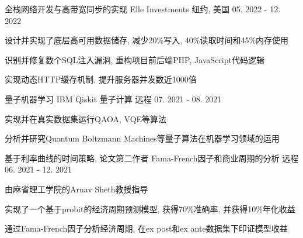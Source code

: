 \begin{cventries}
  \cventry
    {全栈网络开发与高带宽同步的实现}
    {Elle Investments}
    {纽约, 美国}
    {05. 2022 - 12. 2022}
    {
      \begin{cvitems}
          \item {设计并实现了底层高可用数据储存, 减少20\%写入, 40\%读取时间和45\%内存使用}
          \item {识别并修复数个SQL注入漏洞, 重构项目前后端PHP, JavaScript代码逻辑}
          \item {实现动态HTTP缓存机制, 提升服务器并发数近1000倍}
      \end{cvitems}
    }

  \cventry
    {量子机器学习}
    {IBM Qiskit 量子计算}
    {远程}
    {07. 2021 - 08. 2021}
    {
      \begin{cvitems}
        \item {实现并在真实数据集运行QAOA, VQE等算法}
        \item {分析并研究Quantum Boltzmann Machines等量子算法在机器学习领域的运用}
      \end{cvitems}
    }

  \cventry
    {基于利率曲线的时间策略, 论文第二作者}
    {Fama-French因子和商业周期的分析}
    {远程}
    {06. 2021 - 12. 2021}
    {
      \begin{cvitems}
        \item {由麻省理工学院的Arnav Sheth教授指导}
        \item {实现了一个基于probit的经济周期预测模型, 获得70\%准确率, 并获得10\%年化收益}
        \item {通过Fama-French因子分析经济周期, 在ex post和ex ante数据集下印证模型收益}
      \end{cvitems}
    }

  \begin{comment}
  \cventry
  {Full-stack development for an event-driven quantitative trading simulation}
  {Quantitative trading PaaS}
  {Remote}
  {Sep. 2020 - PRESENT}
  {
    \begin{cvitems}
      \item {Implemented benchmark tools based upon ARIMA and Prophet}
      \item {Designed UI\&UX with quantified alpha/beta testing, improving user experience}
      \item {Proposed low latency APIs that allow high frequency trading via HTTP}
    \end{cvitems}
  }
  

\end{comment}
\end{cventries}
